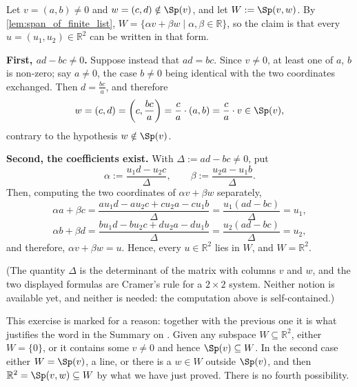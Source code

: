 \begin{exercisesolution}
\label{sol:two_vectors_span_plane}
Let $v = (a, b) \ne 0$ and $w = (c, d) \notin \Sp(v)$, and let $W := \Sp(v, w)$. By \cref{lem:span_of_finite_list}, $W = \{\alpha v + \beta w \mid \alpha, \beta \in \mathbb{R}\}$, so the claim is that every $u = (u_1, u_2) \in \mathbb{R}^2$ can be written in that form.

\textbf{First, $ad - bc \ne 0$.} Suppose instead that $ad = bc$. Since $v \ne 0$, at least one of $a$, $b$ is non-zero; say $a \ne 0$, the case $b \ne 0$ being identical with the two coordinates exchanged. Then $d = \frac{bc}{a}$, and therefore
\[
    w = (c, d) = \left(c, \frac{bc}{a}\right) = \frac{c}{a} \cdot (a, b) = \frac{c}{a} \cdot v \in \Sp(v),
\]
contrary to the hypothesis $w \notin \Sp(v)$.

\textbf{Second, the coefficients exist.} With $\Delta := ad - bc \ne 0$, put
\[
    \alpha := \frac{u_1 d - u_2 c}{\Delta}, \qquad \beta := \frac{u_2 a - u_1 b}{\Delta}.
\]
Then, computing the two coordinates of $\alpha v + \beta w$ separately,
\[
    \alpha a + \beta c = \frac{a u_1 d - a u_2 c + c u_2 a - c u_1 b}{\Delta} = \frac{u_1 (ad - bc)}{\Delta} = u_1,
\]
\[
    \alpha b + \beta d = \frac{b u_1 d - b u_2 c + d u_2 a - d u_1 b}{\Delta} = \frac{u_2 (ad - bc)}{\Delta} = u_2,
\]
and therefore, $\alpha v + \beta w = u$. Hence, every $u \in \mathbb{R}^2$ lies in $W$, and $W = \mathbb{R}^2$.

(The quantity $\Delta$ is the determinant of the matrix with columns $v$ and $w$, and the two displayed formulas are Cramer's rule for a $2 \times 2$ system. Neither notion is available yet, and neither is needed: the computation above is self-contained.)

This exercise is marked  for a reason: together with the previous one it is what justifies the word  in the Summary on . Given any subspace $W \subseteq \mathbb{R}^2$, either $W = \{0\}$, or it contains some $v \ne 0$ and hence $\Sp(v) \subseteq W$. In the second case either $W = \Sp(v)$, a line, or there is a $w \in W$ outside $\Sp(v)$, and then $\mathbb{R}^2 = \Sp(v,w) \subseteq W$ by what we have just proved. There is no fourth possibility.
\end{exercisesolution}


